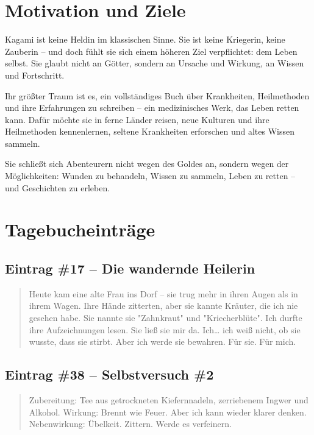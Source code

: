 \documentclass[12pt,a4paper]{article}
\begin{document}
\newpage

\section{Motivation und Ziele}

Kagami ist keine Heldin im klassischen Sinne. Sie ist keine Kriegerin, keine Zauberin – und doch fühlt sie sich einem höheren Ziel verpflichtet: dem Leben selbst. Sie glaubt nicht an Götter, sondern an Ursache und Wirkung, an Wissen und Fortschritt.

Ihr größter Traum ist es, ein vollständiges Buch über Krankheiten, Heilmethoden und ihre Erfahrungen zu schreiben – ein medizinisches Werk, das Leben retten kann. Dafür möchte sie in ferne Länder reisen, neue Kulturen und ihre Heilmethoden kennenlernen, seltene Krankheiten erforschen und altes Wissen sammeln.

Sie schließt sich Abenteurern nicht wegen des Goldes an, sondern wegen der Möglichkeiten: Wunden zu behandeln, Wissen zu sammeln, Leben zu retten – und Geschichten zu erleben.

\newpage

\section{Tagebucheinträge}

\subsection*{Eintrag \#17 – Die wandernde Heilerin}

\begin{quote}
Heute kam eine alte Frau ins Dorf – sie trug mehr in ihren Augen als in ihrem Wagen. Ihre Hände zitterten, aber sie kannte Kräuter, die ich nie gesehen habe. Sie nannte sie "Zahnkraut" und "Kriecherblüte". Ich durfte ihre Aufzeichnungen lesen. Sie ließ sie mir da. Ich… ich weiß nicht, ob sie wusste, dass sie stirbt. Aber ich werde sie bewahren. Für sie. Für mich.
\end{quote}

\subsection*{Eintrag \#38 – Selbstversuch \#2}

\begin{quote}
Zubereitung: Tee aus getrockneten Kiefernnadeln, zerriebenem Ingwer und Alkohol.  
Wirkung: Brennt wie Feuer. Aber ich kann wieder klarer denken.  
Nebenwirkung: Übelkeit. Zittern. Werde es verfeinern.
\end{quote}
\end{document}
